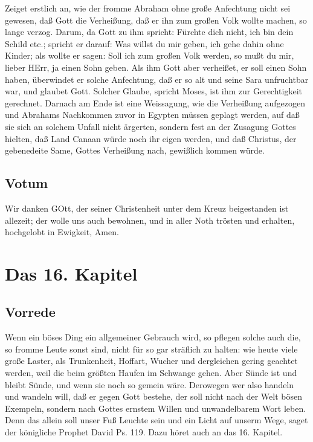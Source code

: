 Zeiget erstlich an, wie der fromme Abraham ohne große Anfechtung nicht sei gewesen, daß Gott die Verheißung, daß er ihn zum großen Volk wollte machen, so lange verzog. Darum, da Gott zu ihm spricht: Fürchte dich nicht, ich bin dein Schild etc.; spricht er darauf: Was willst du mir geben, ich gehe dahin ohne Kinder; als wollte er sagen: Soll ich zum großen Volk werden, so mußt du mir, lieber HErr, ja einen Sohn geben. Als ihm Gott aber verheißet, er soll einen Sohn haben, überwindet er solche Anfechtung, daß er so alt und seine Sara unfruchtbar war, und glaubet Gott. Solcher Glaube, spricht Moses, ist ihm zur Gerechtigkeit gerechnet. Darnach am Ende ist eine Weissagung, wie die Verheißung aufgezogen und Abrahams Nachkommen zuvor in Egypten müssen geplagt werden, auf daß sie sich an solchem Unfall nicht ärgerten, sondern fest an der Zusagung Gottes hielten, daß Land Canaan würde noch ihr eigen werden, und daß Christus, der gebenedeite Same, Gottes Verheißung nach, gewißlich kommen würde.

\section{Votum}

Wir danken GOtt, der seiner Christenheit unter dem Kreuz beigestanden ist allezeit;
der wolle uns auch bewohnen, und in aller Noth trösten und erhalten, hochgelobt in Ewigkeit, Amen.

\chapter{Das 16. Kapitel}

\section{Vorrede}

Wenn ein böses Ding ein allgemeiner Gebrauch wird, so pflegen solche auch die, so fromme Leute sonst sind, nicht für so gar sträflich zu halten: wie heute viele große Laster, als Trunkenheit, Hoffart, Wucher und dergleichen gering geachtet werden, weil die beim größten Haufen im Schwange gehen. Aber Sünde ist und bleibt Sünde, und wenn sie noch so gemein wäre. Derowegen wer also handeln und wandeln will, daß er gegen Gott bestehe, der soll nicht nach der Welt bösen Exempeln, sondern nach Gottes ernstem Willen und unwandelbarem Wort leben. Denn das allein soll unser Fuß Leuchte sein und ein Licht auf unserm Wege, saget der königliche Prophet David Ps. 119. Dazu höret auch an das 16. Kapitel.

